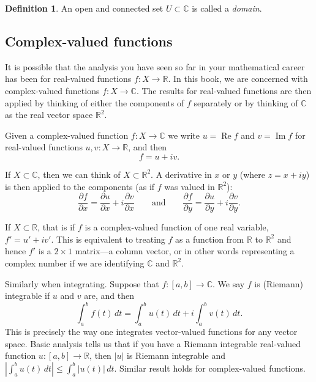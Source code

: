 \documentclass[12pt,openany]{book}
\renewcommand{\Re}{\operatorname{Re}}
\renewcommand{\Im}{\operatorname{Im}}
\newcommand{\sabs}[1]{\lvert {#1} \rvert}
\newcommand{\abs}[1]{\left\lvert {#1} \right\rvert}
\newcommand{\C}{{\mathbb{C}}}
\newcommand{\R}{{\mathbb{R}}}
\newcommand{\myindex}[1]{#1\index{#1}}
\theoremstyle{plain}
\theoremstyle{remark}
\theoremstyle{definition}
\newtheorem{defn}[thm]{Definition}
\theoremstyle{exercise}
\theoremstyle{example}
\begin{document}
\begin{defn}
An open and connected set $U \subset \C$ is called a
\emph{\myindex{domain}}.
\end{defn}

\subsection{Complex-valued functions}

It is possible that the analysis you have seen so far in your mathematical
career has been for real-valued functions $f \colon X \to \R$.  In this
book, we are concerned with complex-valued functions $f \colon X \to \C$.
The results for real-valued functions are then applied by thinking of
either the components of $f$ separately or by thinking of $\C$ as the
real vector space $\R^2$.

Given a complex-valued function $f \colon X \to \C$ we write $u = \Re f$
and $v = \Im f$ for real-valued functions $u,v \colon X \to \R$, and then
\begin{equation*}
f = u+iv .
\end{equation*}

If $X \subset \C$, then we can think of $X \subset \R^2$.
A derivative in $x$ or $y$ (where $z=x+iy$) is then applied to the
components (as if $f$ was valued in $\R^2$):
\begin{equation*}
\frac{\partial f}{\partial x} = 
\frac{\partial u}{\partial x} + i
\frac{\partial v}{\partial x}
\qquad\text{and}\qquad
\frac{\partial f}{\partial y} = 
\frac{\partial u}{\partial y} + i
\frac{\partial v}{\partial y} .
\end{equation*}

If $X \subset \R$, that is if $f$ is a complex-valued
function of one real variable, $f' = u' + iv'$.
This is equivalent to treating $f$ as a function from $\R$ to $\R^2$
and hence $f'$ is a $2 \times 1$ matrix---a column vector, or in other words
representing a complex number if we are identifying $\C$ and $\R^2$.

Similarly when integrating.  Suppose that $f \colon [a,b] \to \C$.
We say $f$ is (Riemann) integrable if $u$ and $v$ are, and then
\begin{equation*}
\int_a^b f(t) \, dt = 
\int_a^b u(t) \, dt + i \int_a^b v(t) \, dt .
\end{equation*}
This is precisely the way one integrates vector-valued functions
for any vector space.  Basic analysis tells us that
if you have a Riemann integrable
real-valued function $u \colon [a,b] \to \R$, then $\abs{u}$ is Riemann
integrable and $\abs{\int_a^b u(t) \, dt} \leq \int_a^b \sabs{u(t)} \, dt$.
Similar result holds for complex-valued functions.
\end{document}
